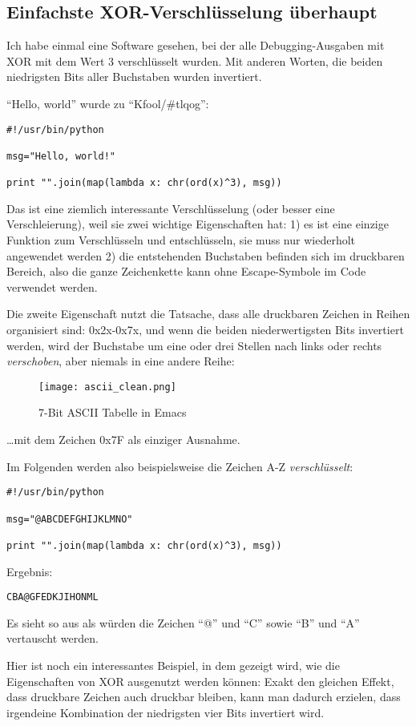 \subsection{Einfachste XOR-Verschlüsselung überhaupt}

Ich habe einmal eine Software gesehen, bei der alle Debugging-Ausgaben mit XOR mit dem Wert 3
verschlüsselt wurden. Mit anderen Worten, die beiden niedrigsten Bits aller Buchstaben wurden invertiert.

``Hello, world'' wurde zu ``Kfool/\#tlqog'':

\begin{lstlisting}
#!/usr/bin/python

msg="Hello, world!"

print "".join(map(lambda x: chr(ord(x)^3), msg))
\end{lstlisting}

Das ist eine ziemlich interessante Verschlüsselung (oder besser eine Verschleierung),
weil sie zwei wichtige Eigenschaften hat:
1) es ist eine einzige Funktion zum Verschlüsseln und entschlüsseln, sie muss nur wiederholt angewendet werden
2) die entstehenden Buchstaben befinden sich im druckbaren Bereich, also die ganze Zeichenkette kann ohne
Escape-Symbole im Code verwendet werden.

Die zweite Eigenschaft nutzt die Tatsache, dass alle druckbaren Zeichen in Reihen organisiert sind: 0x2x-0x7x,
und wenn die beiden niederwertigsten Bits invertiert werden, wird der Buchstabe um eine oder drei Stellen nach
links oder rechts \emph{verschoben}, aber niemals in eine andere Reihe:

\begin{figure}[H]
\centering
\texttt{[image: ascii\_clean.png]}
\caption{7-Bit \ac{ASCII} Tabelle in Emacs}
\end{figure}

\dots mit dem Zeichen 0x7F als einziger Ausnahme.

Im Folgenden werden also beispielsweise die Zeichen A-Z \emph{verschlüsselt}:

\begin{lstlisting}
#!/usr/bin/python

msg="@ABCDEFGHIJKLMNO"

print "".join(map(lambda x: chr(ord(x)^3), msg))
\end{lstlisting}

Ergebnis:
\begin{lstlisting}
CBA@GFEDKJIHONML
\end{lstlisting}

Es sieht so aus als würden die Zeichen ``@'' und ``C'' sowie ``B'' und ``A'' vertauscht werden.

Hier ist noch ein interessantes Beispiel, in dem gezeigt wird, wie die Eigenschaften von XOR
ausgenutzt werden können: Exakt den gleichen Effekt, dass druckbare Zeichen auch druckbar bleiben,
kann man dadurch erzielen, dass irgendeine Kombination der niedrigsten vier Bits invertiert wird.
